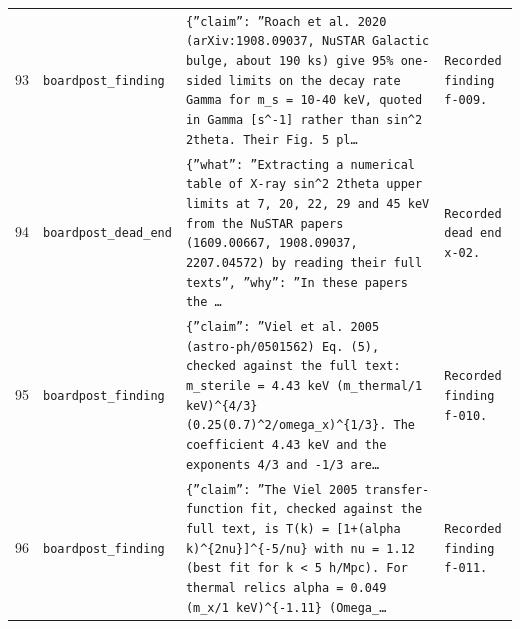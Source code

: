 \documentclass[11pt,a4paper]{article}
\begin{document}
\begin{longtable}{@{}p{}p{}p{}p{}@{}}
93 & \texttt{board}\newline\texttt{post\_\allowbreak{}finding} & \texttt{\{''claim'':\allowbreak{} ''Roach et al. 2020 (arXiv:\allowbreak{}1908.09037,\allowbreak{} NuSTAR Galactic bulge,\allowbreak{} about 190 ks)\allowbreak{} give 95\% one-sided limits on the decay rate Gamma for m\_\allowbreak{}s =\allowbreak{} 10-40 keV,\allowbreak{} quoted in Gamma [s\textasciicircum{}\allowbreak{}-1]\allowbreak{} rather than sin\textasciicircum{}\allowbreak{}2 2theta. Their Fig. 5 pl\ldots{}\allowbreak{}} & \texttt{Recorded finding f-009.} \\
94 & \texttt{board}\newline\texttt{post\_\allowbreak{}dead\_\allowbreak{}end} & \texttt{\{''what'':\allowbreak{} ''Extracting a numerical table of X-ray sin\textasciicircum{}\allowbreak{}2 2theta upper limits at 7,\allowbreak{} 20,\allowbreak{} 22,\allowbreak{} 29 and 45 keV from the NuSTAR papers (1609.00667,\allowbreak{} 1908.09037,\allowbreak{} 2207.04572)\allowbreak{} by reading their full texts'',\allowbreak{} ''why'':\allowbreak{} ''In these papers the \ldots{}\allowbreak{}} & \texttt{Recorded dead end x-02.} \\
95 & \texttt{board}\newline\texttt{post\_\allowbreak{}finding} & \texttt{\{''claim'':\allowbreak{} ''Viel et al. 2005 (astro-ph/\allowbreak{}0501562)\allowbreak{} Eq. (5)\allowbreak{},\allowbreak{} checked against the full text:\allowbreak{} m\_\allowbreak{}sterile =\allowbreak{} 4.43 keV (m\_\allowbreak{}thermal/\allowbreak{}1 keV)\allowbreak{}\textasciicircum{}\allowbreak{}\{4/\allowbreak{}3\}\allowbreak{} (0.25(0.7)\allowbreak{}\textasciicircum{}\allowbreak{}2/\allowbreak{}omega\_\allowbreak{}x)\allowbreak{}\textasciicircum{}\allowbreak{}\{1/\allowbreak{}3\}\allowbreak{}. The coefficient 4.43 keV and the exponents 4/\allowbreak{}3 and -1/\allowbreak{}3 are\ldots{}\allowbreak{}} & \texttt{Recorded finding f-010.} \\
96 & \texttt{board}\newline\texttt{post\_\allowbreak{}finding} & \texttt{\{''claim'':\allowbreak{} ''The Viel 2005 transfer-function fit,\allowbreak{} checked against the full text,\allowbreak{} is T(k)\allowbreak{} =\allowbreak{} [1+(alpha k)\allowbreak{}\textasciicircum{}\allowbreak{}\{2nu\}\allowbreak{}]\allowbreak{}\textasciicircum{}\allowbreak{}\{-5/\allowbreak{}nu\}\allowbreak{} with nu =\allowbreak{} 1.12 (best fit for k \textless{}\allowbreak{} 5 h/\allowbreak{}Mpc)\allowbreak{}. For thermal relics alpha =\allowbreak{} 0.049 (m\_\allowbreak{}x/\allowbreak{}1 keV)\allowbreak{}\textasciicircum{}\allowbreak{}\{-1.11\}\allowbreak{} (Omega\_\allowbreak{}\ldots{}\allowbreak{}} & \texttt{Recorded finding f-011.} \\

\end{longtable}
\end{document}
